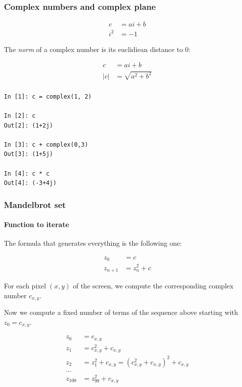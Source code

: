\documentclass[9pt]{beamer}
\begin{document}
\begin{frame}[fragile]
  \frametitle{Complex numbers and complex plane}

  \begin{align*}
    c &= ai + b\\
    i^{2} &= -1
  \end{align*}

  The \emph{norm} of a complex number is its euclidiean distance to 0:

  \begin{align*}
    c &= ai + b \\
    |c| &= \sqrt{a^{2}+b^{2}} \\
  \end{align*}

  \begin{verbatim}
In [1]: c = complex(1, 2)

In [2]: c
Out[2]: (1+2j)

In [3]: c + complex(0,3)
Out[3]: (1+5j)

In [4]: c * c
Out[4]: (-3+4j)
  \end{verbatim}

\end{frame}

\begin{frame}
  \frametitle{Mandelbrot set}

  \framesubtitle{Function to iterate}

  The formula that generates everything is the following one:

  \begin{align*}
    z_{0} &= c \\
    z_{n + 1} &= z_{n}^{2} + c
  \end{align*}

  For each pixel $(x, y)$ of the screen, we compute the corresponding
  complex number $c_{x,y}$.

  \bigskip

  Now we compute a fixed number of terms of the sequence above
  starting with $z_{0} = c_{x,y}$.

  \begin{align*}
    z_{0} &= c_{x, y} \\
    z_{1} &= c_{x, y}^{2} + c_{x, y} \\
    z_{2} &= z_{1}^{2} + c_{x, y} = (c_{x, y}^{2} + c_{x, y})^{2} + c_{x, y} \\
    \dots \\
    z_{100} &= z_{99}^{2} + c_{x, y}
  \end{align*}

\end{frame}
\end{document}
